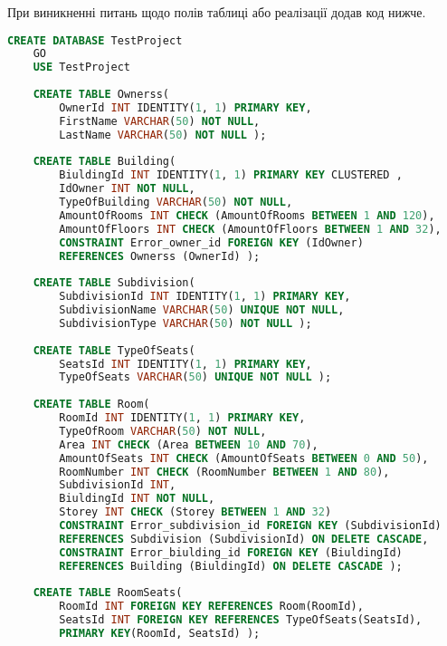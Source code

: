 \documentclass[a4paper,12pt]{article}
\begin{document}
\newpage
    При виникненні питань щодо полів таблиці або реалізації додав код нижче.
    \begin{lstlisting}[language=SQL]
    CREATE DATABASE TestProject
    GO
    USE TestProject
        
    CREATE TABLE Ownerss(
        OwnerId INT IDENTITY(1, 1) PRIMARY KEY,
        FirstName VARCHAR(50) NOT NULL,
        LastName VARCHAR(50) NOT NULL );
        
    CREATE TABLE Building(
        BiuldingId INT IDENTITY(1, 1) PRIMARY KEY CLUSTERED ,
        IdOwner INT NOT NULL,
        TypeOfBuilding VARCHAR(50) NOT NULL,
        AmountOfRooms INT CHECK (AmountOfRooms BETWEEN 1 AND 120),
        AmountOfFloors INT CHECK (AmountOfFloors BETWEEN 1 AND 32),
        CONSTRAINT Error_owner_id FOREIGN KEY (IdOwner) 
        REFERENCES Ownerss (OwnerId) );
        
    CREATE TABLE Subdivision(
        SubdivisionId INT IDENTITY(1, 1) PRIMARY KEY,
        SubdivisionName VARCHAR(50) UNIQUE NOT NULL,
        SubdivisionType VARCHAR(50) NOT NULL );
        
    CREATE TABLE TypeOfSeats(
        SeatsId INT IDENTITY(1, 1) PRIMARY KEY,
        TypeOfSeats VARCHAR(50) UNIQUE NOT NULL ); 
        
    CREATE TABLE Room(
        RoomId INT IDENTITY(1, 1) PRIMARY KEY,
        TypeOfRoom VARCHAR(50) NOT NULL,
        Area INT CHECK (Area BETWEEN 10 AND 70), 
        AmountOfSeats INT CHECK (AmountOfSeats BETWEEN 0 AND 50), 
        RoomNumber INT CHECK (RoomNumber BETWEEN 1 AND 80), 
        SubdivisionId INT,
        BiuldingId INT NOT NULL,
        Storey INT CHECK (Storey BETWEEN 1 AND 32)
        CONSTRAINT Error_subdivision_id FOREIGN KEY (SubdivisionId) 
        REFERENCES Subdivision (SubdivisionId) ON DELETE CASCADE,
        CONSTRAINT Error_biulding_id FOREIGN KEY (BiuldingId) 
        REFERENCES Building (BiuldingId) ON DELETE CASCADE );
        
    CREATE TABLE RoomSeats(
        RoomId INT FOREIGN KEY REFERENCES Room(RoomId),
        SeatsId INT FOREIGN KEY REFERENCES TypeOfSeats(SeatsId),
        PRIMARY KEY(RoomId, SeatsId) );
    \end{lstlisting}
\end{document}

